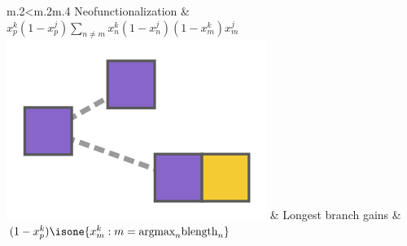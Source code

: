 \documentclass[aspectratio=169, 9pt]{beamer}
\begin{document}
\begin{frame}
\begin{table}
\begin{tabular}{m{.2\linewidth}<\centering m{.2\linewidth}m{.4\linewidth}}
		Neofunctionalization & $x_p^k(1 - x_p^j)\sum_{n\neq m}x_n^k(1-x_n^j)(1-x_m^k)x_m^j$ \\
	\includegraphics[width=\fwidth]{fig/term-longest.png} & %
		Longest branch gains & $(1-x_p^k)\isone{x_m^k : m=\mbox{argmax}_n\mbox{blength}_n}$ \\
	\bottomrule
	\end{tabular}
	\caption{Example of sufficient statistics for evolutionary transitions.}
	\end{table}
\end{frame}
\end{document}
